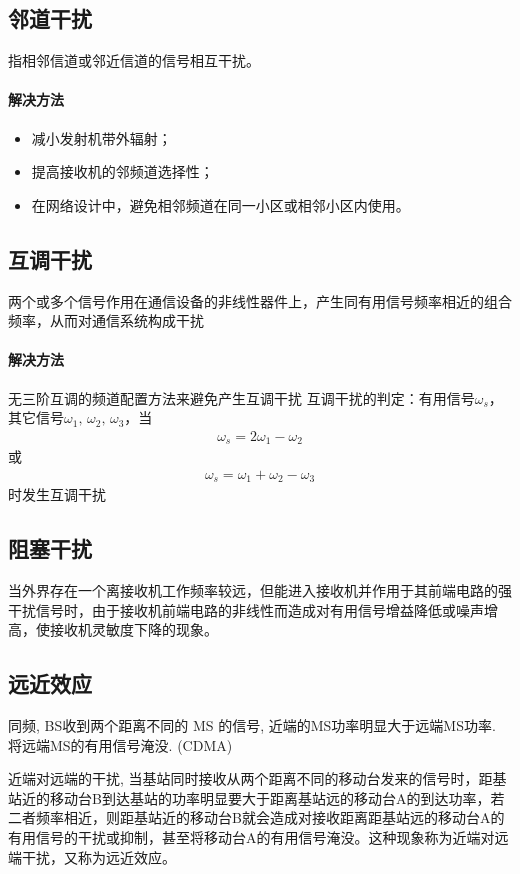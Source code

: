\documentclass[a4paper]{report}
\begin{document}
\subsection{邻道干扰}指相邻信道或邻近信道的信号相互干扰。
\paragraph{解决方法}
\begin{itemize}
	\item 减小发射机带外辐射；
	\item 提高接收机的邻频道选择性；
	\item 在网络设计中，避免相邻频道在同一小区或相邻小区内使用。
\end{itemize}

\subsection{互调干扰}两个或多个信号作用在通信设备的非线性器件上，产生同有用信号频率相近的组合频率，从而对通信系统构成干扰
\paragraph{解决方法}无三阶互调的频道配置方法来避免产生互调干扰
互调干扰的判定：有用信号$\omega_s$，其它信号$\omega_1,\,\omega_2,\,\omega_3$，当
\begin{align*}
	\omega_s = 2\omega_1 - \omega_2
\end{align*}
或
\begin{align*}
	\omega_s = \omega_1+\omega_2-\omega_3
\end{align*}
时发生互调干扰


\subsection{阻塞干扰}当外界存在一个离接收机工作频率较远，但能进入接收机并作用于其前端电路的强干扰信号时，由于接收机前端电路的非线性而造成对有用信号增益降低或噪声增高，使接收机灵敏度下降的现象。

\subsection{远近效应}
同频, BS收到两个距离不同的 MS 的信号, 近端的MS功率明显大于远端MS功率. 将远端MS的有用信号淹没. (CDMA)

近端对远端的干扰, 当基站同时接收从两个距离不同的移动台发来的信号时，距基站近的移动台B到达基站的功率明显要大于距离基站远的移动台A的到达功率，若二者频率相近，则距基站近的移动台B就会造成对接收距离距基站远的移动台A的有用信号的干扰或抑制，甚至将移动台A的有用信号淹没。这种现象称为近端对远端干扰，又称为远近效应。
\end{document}
